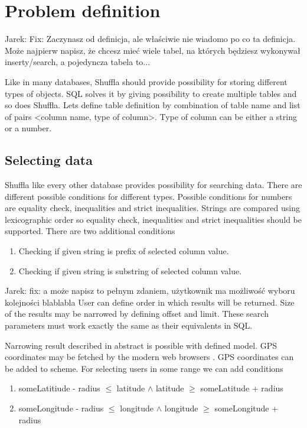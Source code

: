 \documentclass[10pt,a4paper]{article}
\newcommand{\jarek}[1]{\noindent\colorbox{myYellow}{Jarek: #1}}
\begin{document}
\section{Problem definition}

\jarek{Fix: Zaczynasz od definicja, ale właściwie nie wiadomo po co ta definicja. Może najpierw napisz, że chcesz mieć wiele tabel, na których będziesz wykonywał inserty/search, a pojedyncza tabela to...}

Like in many databases, Shuffla should provide possibility for storing different types of objects. SQL solves it by giving possibility to create multiple tables and so does Shuffla. Lets define table definition by combination of table name and list of pairs <column name, type of column>. Type of column can be either a string or a number.

\subsection{Selecting data}
Shuffla like every other database provides possibility for searching data. 
There are different possible conditions for different types. Possible conditions for numbers are equality check, inequalities and strict inequalities. Strings are compared using lexicographic order so equality check, inequalities and strict inequalities should be supported. There are two additional conditions
\begin{enumerate}
\item Checking if given string is prefix of selected column value.
\item Checking if given string is substring of selected column value. 
\end{enumerate}

\jarek{fix: a może napisz to pełnym zdaniem, użytkownik ma możliwość wyboru kolejności blablabla}
User can define order in which results will be returned. Size of the results may be narrowed by defining offset and limit. These search parameters must work exactly the same as their equivalents in SQL.

Narrowing result described in abstract is possible with defined model. GPS coordinates may be fetched by the modern web browsers \cite{FETCHGPS}. GPS coordinates can be added to scheme. For selecting users in some range we can add conditions   
\begin{enumerate}
\item{someLatitiude - radius $\leq$ latitude $\wedge$ latitude $\geq$ someLatitude + radius}
\item{someLongitude - radius $\leq$ longitude $\wedge$ longitude $\geq$ someLongitude + radius}
\end{enumerate}
\end{document}

